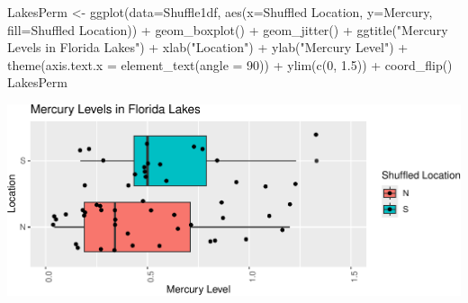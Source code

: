 \documentclass[
  letterpaper,
  DIV=11,
  numbers=noendperiod]{scrreprt}
\newenvironment{Shaded}{\begin{snugshade}}{\end{snugshade}}
\newcommand{\AttributeTok}[1]{\textcolor[rgb]{0.40,0.45,0.13}{#1}}
\newcommand{\DecValTok}[1]{\textcolor[rgb]{0.68,0.00,0.00}{#1}}
\newcommand{\FloatTok}[1]{\textcolor[rgb]{0.68,0.00,0.00}{#1}}
\newcommand{\FunctionTok}[1]{\textcolor[rgb]{0.28,0.35,0.67}{#1}}
\newcommand{\NormalTok}[1]{\textcolor[rgb]{0.00,0.23,0.31}{#1}}
\newcommand{\OtherTok}[1]{\textcolor[rgb]{0.00,0.23,0.31}{#1}}
\newcommand{\SpecialCharTok}[1]{\textcolor[rgb]{0.37,0.37,0.37}{#1}}
\newcommand{\StringTok}[1]{\textcolor[rgb]{0.13,0.47,0.30}{#1}}
\begin{document}
\begin{Shaded}
\end{Shaded}

\begin{Shaded}
\begin{Highlighting}[]
\NormalTok{LakesPerm }\OtherTok{\textless{}{-}} \FunctionTok{ggplot}\NormalTok{(}\AttributeTok{data=}\NormalTok{Shuffle1df, }\FunctionTok{aes}\NormalTok{(}\AttributeTok{x=}\StringTok{\textasciigrave{}}\AttributeTok{Shuffled Location}\StringTok{\textasciigrave{}}\NormalTok{, }\AttributeTok{y=}\NormalTok{Mercury, }\AttributeTok{fill=}\StringTok{\textasciigrave{}}\AttributeTok{Shuffled Location}\StringTok{\textasciigrave{}}\NormalTok{)) }\SpecialCharTok{+} 
  \FunctionTok{geom\_boxplot}\NormalTok{() }\SpecialCharTok{+}   \FunctionTok{geom\_jitter}\NormalTok{() }\SpecialCharTok{+} \FunctionTok{ggtitle}\NormalTok{(}\StringTok{"Mercury Levels in Florida Lakes"}\NormalTok{) }\SpecialCharTok{+} 
  \FunctionTok{xlab}\NormalTok{(}\StringTok{"Location"}\NormalTok{) }\SpecialCharTok{+} \FunctionTok{ylab}\NormalTok{(}\StringTok{"Mercury Level"}\NormalTok{) }\SpecialCharTok{+} \FunctionTok{theme}\NormalTok{(}\AttributeTok{axis.text.x =} \FunctionTok{element\_text}\NormalTok{(}\AttributeTok{angle =} \DecValTok{90}\NormalTok{)) }\SpecialCharTok{+} \FunctionTok{ylim}\NormalTok{(}\FunctionTok{c}\NormalTok{(}\DecValTok{0}\NormalTok{, }\FloatTok{1.5}\NormalTok{)) }\SpecialCharTok{+} \FunctionTok{coord\_flip}\NormalTok{()}
\NormalTok{LakesPerm}
\end{Highlighting}
\end{Shaded}

\includegraphics{Ch3_files/figure-pdf/unnamed-chunk-191-1.pdf}
\end{document}

